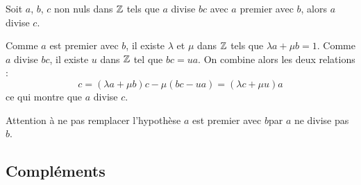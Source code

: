 \begin{thm}[de Gauss]
 Soit $a$, $b$, $c$ non nuls dans $\mathbb{Z}$ tels que $a$ divise $bc$ avec $a$ premier avec $b$, alors $a$ divise $c$.
\end{thm}
\begin{demo}
 Comme $a$ est premier avec $b$, il existe $\lambda$ et $\mu$ dans $\mathbb{Z}$ tels que $\lambda a + \mu b=1$. Comme $a$ divise $bc$, il existe $u$ dans $\mathbb{Z}$ tel que $bc=ua$. On combine alors les deux relations :
\begin{displaymath}
 c=(\lambda a +\mu b)c - \mu(bc-ua)=(\lambda c +\mu u)a
\end{displaymath}
ce qui montre que $a$ divise $c$.
\end{demo}
\begin{rem}
 Attention à ne pas remplacer l'hypothèse \og$a$ est premier avec $b$\fg par \og$a$ ne divise pas $b$\fg.
\end{rem}

\subsection{Compléments}
